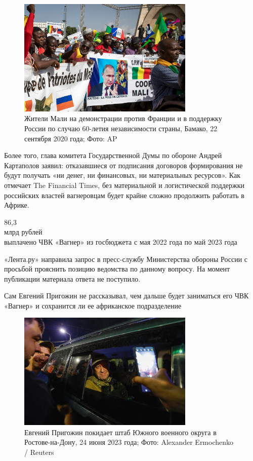 \begin{figure}[h]
    \centering
    \includegraphics[width=0.75\textwidth]{img/pmc_africa_2.jpg}
    \caption{Жители Мали на демонстрации против Франции и в поддержку России по случаю 60-летия независимости страны, Бамако, 22 сентября 2020 года; Фото: AP }
\end{figure}

Более того, глава комитета Государственной Думы по обороне Андрей Картаполов заявил: отказавшиеся от подписания договоров формирования не будут получать «ни денег, ни финансовых, ни материальных ресурсов». Как отмечает The Financial Times, без материальной и логистической поддержки российских властей вагнеровцам будет крайне сложно продолжить работать в Африке.

\begin{center}
    {\Huge 86,3}\\
    {\huge млрд рублей}\\[1em]

    {\Large выплачено ЧВК «Вагнер» из госбюджета с мая 2022 года по май 2023 года }
\end{center}

«Лента.ру» направила запрос в пресс-службу Министерства обороны России с просьбой прояснить позицию ведомства по данному вопросу. На момент публикации материала ответа не поступило.

\begin{center}
    \Large Сам Евгений Пригожин не рассказывал, чем дальше будет заниматься его ЧВК «Вагнер» и сохранится ли ее африканское подразделение
\end{center}


\begin{figure}[h]
    \centering
    \includegraphics[width=0.75\textwidth]{img/pmc_africa_3.jpg}
    \caption{Евгений Пригожин покидает штаб Южного военного округа в Ростове-на-Дону, 24 июня 2023 года; Фото: Alexander Ermochenko / Reuters}
\end{figure}

